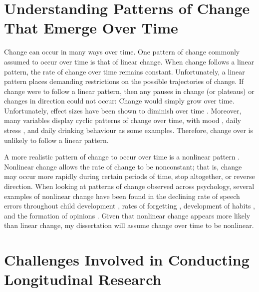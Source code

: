 \documentclass[
12pt, %
twoside,
english]{guelphthesis}
\begin{document}
\hypertarget{understanding-patterns-of-change-that-emerge-over-time}{%
\section{Understanding Patterns of Change That Emerge Over Time}\label{understanding-patterns-of-change-that-emerge-over-time}}

Change can occur in many ways over time. One pattern of change commonly assumed to occur over time is that of linear change. When change follows a linear pattern, the rate of change over time remains constant. Unfortunately, a linear pattern places demanding restrictions on the possible trajectories of change. If change were to follow a linear pattern, then any pauses in change (or plateaus) or changes in direction could not occur: Change would simply grow over time. Unfortunately, effect sizes have been shown to diminish over time \autocites[for meta-analytic examples, see][]{cohen1993,griffeth2000,hom1992,riketta2008,steel1984,steel1990}. Moreover, many variables display cyclic patterns of change over time, with mood \autocite{larsen1990}, daily stress \autocite{bodenmann2010}, and daily drinking behaviour \autocite{huh2015} as some examples. Therefore, change over is unlikely to follow a linear pattern.

A more realistic pattern of change to occur over time is a nonlinear pattern \autocite[for a review, see][]{cudeck2007}. Nonlinear change allows the rate of change to be nonconstant; that is, change may occur more rapidly during certain periods of time, stop altogether, or reverse direction. When looking at patterns of change observed across psychology, several examples of nonlinear change have been found in the declining rate of speech errors throughout child development \autocite{burchinal1991}, rates of forgetting \autocite{murre2015}, development of habits \autocite{fournier2017}, and the formation of opinions \autocite{xia2020}. Given that nonlinear change appears more likely than linear change, my dissertation will assume change over time to be nonlinear.

\hypertarget{challenges-involved-in-conducting-longitudinal-research}{%
\section{Challenges Involved in Conducting Longitudinal Research}\label{challenges-involved-in-conducting-longitudinal-research}}
\end{document}
